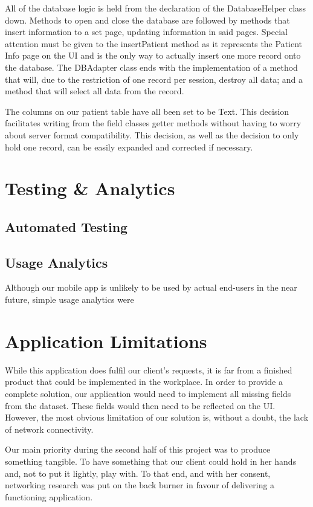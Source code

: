\documentclass[12pt,a4paper,oneside,titlepage]{article}
\begin{document}
All of the database logic is held from the declaration of the DatabaseHelper class down. Methods to open and close the database are followed by methods that insert information to a set page, updating information in said pages. Special attention must be given to the insertPatient method as it represents the Patient Info page on the UI and is the only way to actually insert one more record onto the database. The DBAdapter class ends with the implementation of a method that will, due to the restriction of one record per session, destroy all data; and a method that will select all data from the record.

The columns on our patient table have all been set to be Text. This decision facilitates writing from the field classes getter methods without having to worry about server format compatibility. This decision, as well as the decision to only hold one record, can be easily expanded and corrected if necessary.

\newpage
\section{Testing \& Analytics}
\subsection{Automated Testing}

\subsection{Usage Analytics}
Although our mobile app is unlikely to be used by actual end-users in the near future, simple usage analytics were 

\newpage
\section{Application Limitations}
While this application does fulfil our client's requests, it is far from a finished product that could be implemented in the workplace. In order to provide a complete solution, our application would need to implement all missing fields from the dataset. These fields would then need to be reflected on the UI. However, the most obvious limitation of our solution is, without a doubt, the lack of network connectivity.

Our main priority during the second half of this project was to produce something tangible. To have something that our client could hold in her hands and, not to put it lightly, play with. To that end, and with her consent, networking research was put on the back burner in favour of delivering a functioning application.
\end{document}
